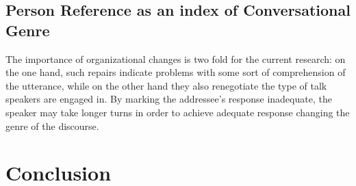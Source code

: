 \documentclass[12pt, draft]{article}
\begin{document}
\subsection{Person Reference as an index of Conversational Genre}
The importance of organizational changes is two fold for the current research: on the one hand, such repairs indicate problems with some sort of comprehension of the utterance, while on the other hand they also renegotiate the type of talk speakers are engaged in. By marking the addressee's response inadequate, the speaker may take longer turns in order to achieve adequate response changing the genre of the discourse.
\section{Conclusion}

\printbibliography
\end{document}
